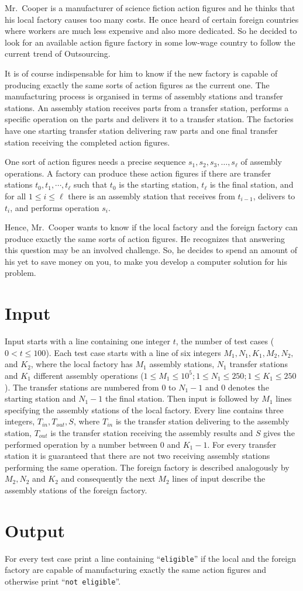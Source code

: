 
Mr.\ Cooper is a manufacturer of science fiction action figures and he thinks that his local factory causes too many costs.
He once heard of certain foreign countries where workers are much less expensive and also more dedicated.
So he decided to look for an available action figure factory in some low-wage country to follow the current trend of Outsourcing.

It is of course indispensable for him to know if the new factory is capable of producing exactly the same sorts of action figures as the current one.
The manufacturing process is organised in terms of assembly stations and transfer stations.
An assembly station receives parts from a transfer station, performs a specific operation on the parts and delivers it to a transfer station.
The factories have one starting transfer station delivering raw parts and one final transfer station receiving the completed action figures.

One sort of action figures needs a precise sequence $s_1, s_2, s_3, \ldots, s_\ell$ of assembly operations.
A factory can produce these action figures if there are transfer stations $t_0, t_1, \cdots, t_\ell$ such that $t_0$ is the starting station, $t_\ell$ is the final station, and for all $1 \le i \le \ell$ there is an assembly station that receives from $t_{i-1}$, delivers to $t_i$, and performs operation $s_i$.

Hence, Mr.\ Cooper wants to know if the local factory and the foreign factory can produce exactly the same sorts of action figures.
He recognizes that answering this question may be an involved challenge.
So, he decides to spend an amount of his yet to save money on you, to make you develop a computer solution for his problem.


\section*{Input}
Input starts with a line containing one integer $t$, the number of test cases ($0 < t \le 100$).
Each test case starts with a line of six integers $M_1, N_1, K_1, M_2, N_2,$ and $K_2$,
where the local factory has $M_1$ assembly stations, $N_1$ transfer stations and $K_1$ different assembly operations ($1 \le M_1 \le 10^5; 1 \le N_1 \le 250; 1 \le K_1 \le 250$).
The transfer stations are numbered from $0$ to $N_1-1$ and $0$ denotes the starting station and $N_1-1$ the final station.
Then input is followed by $M_1$ lines specifying the assembly stations of the local factory.
Every line contains three integers, $T_{in}, T_{out}, S$, where $T_{in}$ is the transfer station delivering to the assembly station, $T_{out}$ is the transfer station receiving the assembly results and $S$ gives the performed operation by a number between $0$ and $K_1-1$.
For every transfer station it is guaranteed that there are not two receiving assembly stations performing the same operation.
The foreign factory is described analogously by $M_2, N_2$ and $K_2$ and consequently the next $M_2$ lines of input describe the assembly stations of the foreign factory.

\section*{Output}
For every test case print a line containing ``\texttt{eligible}'' if the local and the foreign factory are capable of manufacturing exactly the same action figures and otherwise print ``\texttt{not eligible}''.
